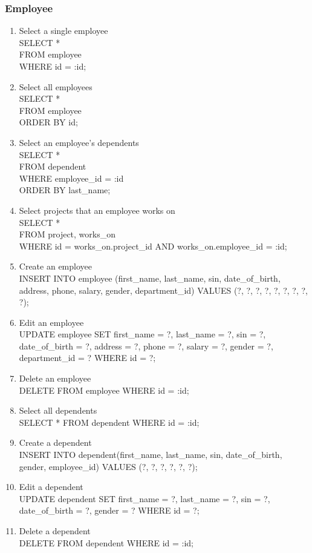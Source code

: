 \documentclass[11pt,letterpaper]{article}
\begin{document}
	\subsubsection{Employee}
	\begin{enumerate}
		\item Select a single employee \\SELECT * \\FROM employee \\WHERE id = :id;
		\item Select all employees \\SELECT * \\FROM employee \\ORDER BY id;
		\item Select an employee's dependents\\SELECT * \\FROM dependent \\WHERE employee\_id = :id \\ORDER BY last\_name;
		\item Select projects that an employee works on\\SELECT * \\FROM project, works\_on \\WHERE id = works\_on.project\_id AND works\_on.employee\_id = :id;
		\item Create an employee \\INSERT INTO employee (first\_name, last\_name, sin, date\_of\_birth, address, phone, salary, gender, department\_id) VALUES (?, ?, ?, ?, ?, ?, ?, ?, ?);
		\item Edit an employee \\UPDATE employee SET first\_name = ?, last\_name = ?, sin = ?, date\_of\_birth = ?, address = ?, phone = ?, salary = ?, gender = ?, department\_id = ? WHERE id = ?;
		\item Delete an employee\\DELETE FROM employee WHERE id = :id;
		\item Select all dependents \\SELECT * FROM dependent WHERE id = :id;
		\item Create a dependent \\INSERT INTO dependent(first\_name, last\_name, sin, date\_of\_birth, gender, employee\_id) VALUES (?, ?, ?, ?, ?, ?);
		\item Edit a dependent \\UPDATE dependent SET first\_name = ?, last\_name = ?, sin = ?, date\_of\_birth = ?, gender = ? WHERE id = ?;
		\item Delete a dependent \\DELETE FROM dependent WHERE id = :id;
	\end{enumerate}
\end{document}
